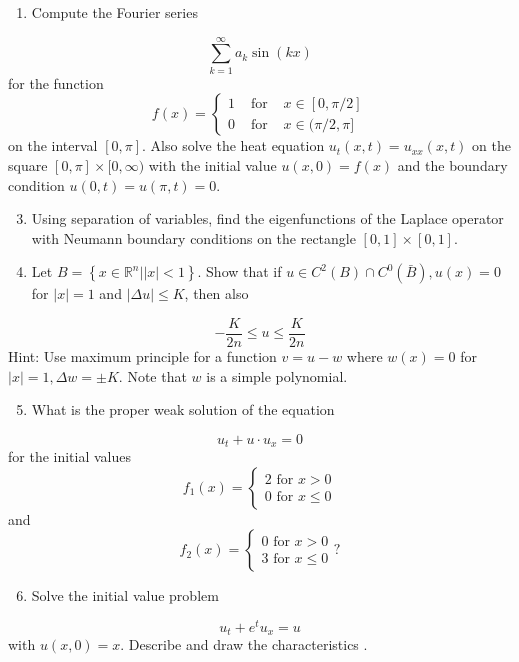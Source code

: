 \documentclass[10pt]{article}
\begin{document}
\begin{enumerate}
  \item Compute the Fourier series
\end{enumerate}
$$
\sum_{k=1}^{\infty} a_{k} \sin (k x)
$$
for the function
$$
f(x)=\left\{\begin{array}{lll}
1 & \text { for } & x \in[0, \pi / 2] \\
0 & \text { for } & x \in(\pi / 2, \pi]
\end{array}\right.
$$
on the interval $[0, \pi]$. Also solve the heat equation $u_{t}(x, t)=u_{x x}(x, t)$ on the square $[0, \pi] \times[0, \infty)$ with the initial value $u(x, 0)=f(x)$ and the boundary condition $u(0, t)=u(\pi, t)=0$.

\begin{enumerate}
  \setcounter{enumi}{2}
  \item Using separation of variables, find the eigenfunctions of the Laplace operator with Neumann boundary conditions on the rectangle $[0,1] \times[0,1]$.

  \item Let $B=\left\{x \in \mathbb{R}^{n}|| x \mid<1\right\}$. Show that if $u \in C^{2}(B) \cap C^{0}(\bar{B}), u(x)=0$ for $|x|=1$ and $|\Delta u| \leq K$, then also

\end{enumerate}
$$
-\frac{K}{2 n} \leq u \leq \frac{K}{2 n}
$$
Hint: Use maximum principle for a function $v=u-w$ where $w(x)=0$ for $|x|=1, \Delta w=\pm K$. Note that $w$ is a simple polynomial.

\begin{enumerate}
  \setcounter{enumi}{4}
  \item What is the proper weak solution of the equation
\end{enumerate}
$$
u_{t}+u \cdot u_{x}=0
$$
for the initial values
$$
f_{1}(x)=\left\{\begin{array}{l}
2 \text { for } x>0 \\
0 \text { for } x \leq 0
\end{array}\right.
$$
and
$$
f_{2}(x)=\left\{\begin{array}{l}
0 \text { for } x>0 \\
3 \text { for } x \leq 0
\end{array} ?\right.
$$

\begin{enumerate}
  \setcounter{enumi}{5}
  \item Solve the initial value problem
\end{enumerate}
$$
u_{t}+e^{t} u_{x}=u
$$
with $u(x, 0)=x$. Describe and draw the characteristics $.$
\end{document}
